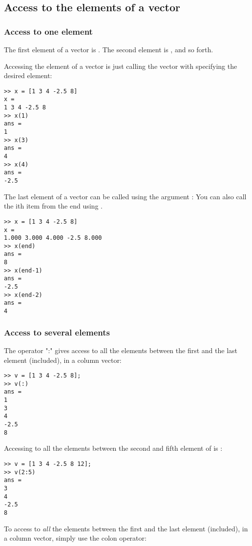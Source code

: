 \subsection{Access to the elements of a vector}

\subsubsection{Access to one element}

The first element of a vector  is .
The second element is , and so forth.

Accessing the element of a vector is just calling the vector with specifying the desired element:

\begin{lstlisting}
>> x = [1 3 4 -2.5 8]
x = 
1 3 4 -2.5 8
>> x(1)
ans = 
1
>> x(3)
ans = 
4
>> x(4)
ans = 
-2.5
\end{lstlisting}




The last element of a vector can be called using the argument :
You can also call the ith item from the end using . 
\begin{lstlisting}
>> x = [1 3 4 -2.5 8]
x = 
1.000 3.000 4.000 -2.5 8.000
>> x(end)
ans = 
8
>> x(end-1)
ans = 
-2.5
>> x(end-2)
ans = 
4
\end{lstlisting}



\subsubsection{Access to several elements}

The operator ":" gives access to all the elements between the first and the last element (included), in a column vector:

\begin{lstlisting}
>> v = [1 3 4 -2.5 8];
>> v(:)
ans = 
1
3
4
-2.5
8
\end{lstlisting}

Accessing to all the elements between the second and fifth element of  is :

\begin{lstlisting}
>> v = [1 3 4 -2.5 8 12];
>> v(2:5)
ans = 
3
4
-2.5
8
\end{lstlisting}
To access to \emph{all} the elements between the first and the last element (included), in a column vector, simply use the colon operator:

